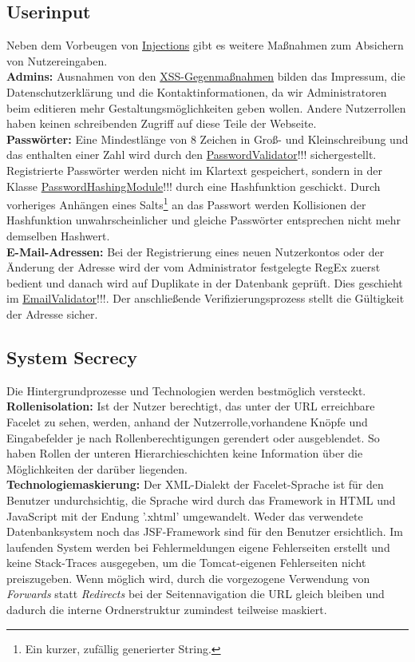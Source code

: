 \documentclass{article}
\begin{document}
\subsection{Userinput}
Neben dem Vorbeugen von \hyperlink{Injections}{Injections} gibt es weitere Maßnahmen zum Absichern von Nutzereingaben.\\
\textbf{Admins:} Ausnahmen von den \hyperlink{XSS}{XSS-Gegenmaßnahmen} bilden das Impressum, die Datenschutzerklärung und  die Kontaktinformationen, da wir Administratoren beim editieren mehr Gestaltungsmöglichkeiten geben wollen. Andere Nutzerrollen haben keinen schreibenden Zugriff auf diese Teile der Webseite.\\
\textbf{Passwörter:} Eine Mindestlänge von 8 Zeichen in Groß- und Kleinschreibung und das enthalten einer Zahl wird durch den \hyperlink{Passwordvalidator}{PasswordValidator}!!! sichergestellt. Registrierte Passwörter werden nicht im Klartext gespeichert, sondern in der Klasse \hyperlink{Hash}{PasswordHashingModule}!!! durch eine Hashfunktion geschickt. Durch vorheriges Anhängen eines Salts\footnote{Ein kurzer, zufällig generierter String.} an das Passwort werden Kollisionen der Hashfunktion unwahrscheinlicher und gleiche Passwörter entsprechen nicht mehr demselben Hashwert.\\
\textbf{E-Mail-Adressen:} Bei der Registrierung eines neuen Nutzerkontos oder der Änderung der Adresse wird der vom Administrator festgelegte RegEx zuerst bedient und danach wird auf Duplikate in der Datenbank geprüft. Dies geschieht im \hyperlink{Emailvalidator}{EmailValidator}!!!. Der anschließende Verifizierungsprozess stellt die Gültigkeit der Adresse sicher.
\subsection{System Secrecy}
Die Hintergrundprozesse und Technologien werden bestmöglich versteckt.\\
\textbf{Rollenisolation:} Ist der Nutzer berechtigt, das unter der URL erreichbare Facelet zu sehen, werden, anhand der Nutzerrolle,vorhandene Knöpfe und Eingabefelder je nach Rollenberechtigungen gerendert oder ausgeblendet. So haben Rollen der unteren Hierarchieschichten keine Information über die Möglichkeiten der darüber liegenden.\\
\textbf{Technologiemaskierung:} Der XML-Dialekt der Facelet-Sprache ist für den Benutzer undurchsichtig, die Sprache wird durch das Framework in HTML und JavaScript mit der Endung '.xhtml' umgewandelt. Weder das verwendete Datenbanksystem noch das JSF-Framework sind für den Benutzer ersichtlich. Im laufenden System werden bei Fehlermeldungen eigene Fehlerseiten erstellt und keine Stack-Traces ausgegeben, um die Tomcat-eigenen Fehlerseiten nicht preiszugeben. Wenn möglich wird, durch die vorgezogene Verwendung von \textit{Forwards} statt \textit{Redirects} bei der Seitennavigation die URL gleich bleiben und dadurch die interne Ordnerstruktur zumindest teilweise maskiert.
\end{document}
